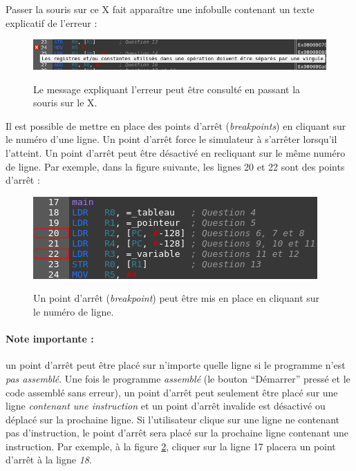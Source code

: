 \documentclass{tufte-handout}
\begin{document}
Passer la souris sur ce X fait apparaître une infobulle contenant un texte explicatif de l'erreur :
\begin{figure}[h!]
\raggedleft
\includegraphics[width=\linewidth]{pics/editeur_err_bulle.png}
\label{f:editeurerrorplus}
\caption{Le message expliquant l'erreur peut être consulté en passant la souris sur le X.}
\end{figure}


Il est possible de mettre en place des points d'arrêt (\textit{breakpoints}) en cliquant sur le numéro d'une ligne. Un point d'arrêt force le simulateur à s'arrêter lorsqu'il l'atteint. Un point d'arrêt peut être désactivé en recliquant sur le même numéro de ligne. Par exemple, dans la figure suivante, les lignes 20 et 22 sont des points d'arrêt :
\begin{figure}[h!]
\raggedleft
\includegraphics[width=0.9\linewidth]{pics/editeur_bkpt.png}
\label{f:editeurbkpt}
\caption{Un point d'arrêt (\textit{breakpoint}) peut être mis en place en cliquant sur le numéro de ligne.}
\end{figure}

\paragraph{\textbf{Note importante :}}un point d'arrêt peut être placé sur n'importe quelle ligne si le programme n'est \emph{pas assemblé}. Une fois le programme \emph{assemblé} (le bouton ``Démarrer'' pressé et le code assemblé sans erreur), un point d'arrêt peut seulement être placé sur une ligne \emph{contenant une instruction} et un point d'arrêt invalide est désactivé ou déplacé sur la prochaine ligne. Si l'utilisateur clique sur une ligne ne contenant pas d'instruction, le point d'arrêt sera placé sur la prochaine ligne contenant une instruction. Par exemple, à la figure \ref{f:editeurbkpt}, cliquer sur la ligne 17 placera un point d'arrêt à la ligne \emph{18}.
\end{document}
